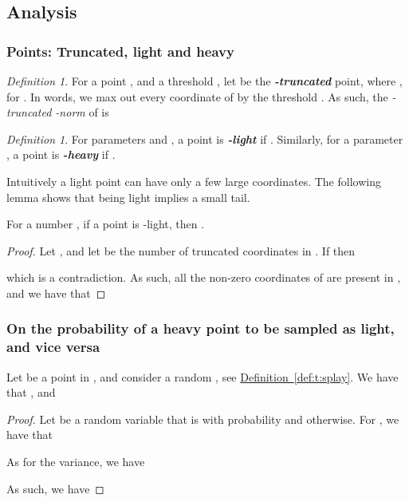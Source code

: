 \documentclass[12pt]{article}\usepackage[cm]{fullpage}
\newcommand{\emphic}[2]{\textcolor{blue25}{\textbf{\emph{#1}}}\index{#2}}
\renewcommand{\emphic}[2]{\textbf{\emph{#1}}}
\newcommand{\emphi}[1]{\emphic{#1}{#1}}
\theoremstyle{remark}\theoremheaderfont{\sf}\theorembodyfont{\upshape}\newtheorem{defn}[theorem]{Definition}
\numberwithin{figure}{section}\numberwithin{table}{section}\numberwithin{equation}{section}
\newcommand{\HLink}[2]{\hyperref[#2]{#1~\ref*{#2}}}
\providecommand{\deflab}[1]{\label{def:#1}}
\newcommand{\defref}[1]{\HLink{Definition}{def:#1}}
\newcommand{\lemlab}[1]{\label{lemma:#1}}
\begin{document}
\subsection{Analysis}

\subsubsection{Points: Truncated, light and heavy}
\begin{defn}
    \deflab{truncate}For a point , and a
    threshold , let
     be
    the \emphi{-truncated} point, where
    , for
    . In words, we max out every coordinate of  by
    the threshold .  As such, the
    \emph{-truncated -norm} of
     is
    
\end{defn}

\begin{defn}
    For parameters  and , a point  is
    \emphi{-light} if
    . Similarly, for a
    parameter , a point is
    \emphi{-heavy} if
    .
\end{defn}

Intuitively a light point can have only a few large coordinates.  The
following lemma shows that being light implies a small tail.

\begin{lemma}\lemlab{lp:light} For a number , if a point  is
    -light, then
    .
\end{lemma}
\begin{proof}
Let , and let  be the number of
    truncated coordinates in . If 
    then
    
    which is a contradiction. As such, all the non-zero coordinates of
     are present in , and
    we have that
    
\end{proof}

\subsubsection{On the probability of a heavy point to be sampled as
   light, and vice versa}


\begin{lemma}
    \lemlab{basic:exp:var} Let  be a point in , and
    consider a random , see
    \defref{t:splay}.  We have that
    , and
    
\end{lemma}
\begin{proof}
    Let  be a random variable that is 
    with probability  and  otherwise. For
    , we have that
    
As for the variance, we have
    
    As such, we have
     \end{proof}
\end{document}
